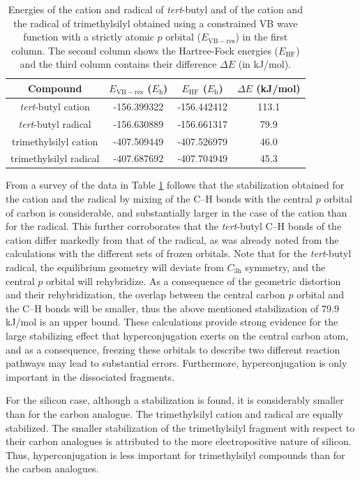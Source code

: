 \begin{table}[htp]
\center
\caption{Energies of the cation and radical of \textit{tert}-butyl and of the cation and the radical of trimethylsilyl obtained using a constrained VB wave function with a strictly atomic $p$ orbital ($E_\mathrm{VB-res}$) in the first column. The second column shows the Hartree-Fock energies ($E_\mathrm{HF}$) and the third column contains their difference $\Delta E$ (in kJ/mol).}
\label{ch3.tab.hyp}
\begin{tabular}{|c|c|c|c|}
\hline
\textbf{Compound} & $E_\mathrm{VB-res}$ ($E_{\mathrm{h}}$) &$E_\mathrm{HF}$ ($E_{\mathrm{h}}$)& $\Delta E$ (kJ/mol)  \\
\hline
\textit{tert}-butyl cation & -156.399322 &-156.442412&113.1  \\
\textit{tert}-butyl radical & -156.630889 &-156.661317&79.9 \\
trimethylsilyl cation & -407.509449&-407.526979&46.0 \\
trimethylsilyl radical &-407.687692&-407.704949&45.3 \\
\hline
\end{tabular}
\end{table}

From a survey of the data in Table \ref{ch3.tab.hyp} follows that the stabilization obtained for the cation and the radical by mixing of the C--H bonds with the central $p$ orbital of carbon is considerable, and substantially larger in the case of the cation than for the radical.  This further corroborates that the \textit{tert}-butyl C--H bonds of the cation differ markedly from that of the radical, as was already noted from the calculations with the different sets of frozen orbitals.  Note that for the \textit{tert}-butyl radical, the equilibrium geometry will deviate from $C_\mathrm{3h}$ symmetry, and the central $p$ orbital will rehybridize.  As a consequence of the geometric distortion and their rehybridization, the overlap between the central carbon $p$ orbital and the C--H bonds will be smaller, thus the above mentioned stabilization of 79.9 kJ/mol is an upper bound.  These calculations provide strong evidence for the large stabilizing effect that hyperconjugation exerts on the central carbon atom, and as a consequence, freezing these orbitals to describe two different reaction pathways may lead to substantial errors.  Furthermore, hyperconjugation is only important in the dissociated fragments.

For the silicon case, although a stabilization is found, it is considerably smaller than for the carbon analogue.  The trimethylsilyl cation and radical are equally stabilized.  The smaller stabilization of the trimethylsilyl fragment with respect to their carbon analogues is attributed to the more electropositive nature of silicon. Thus, hyperconjugation is less important for trimethylsilyl compounds than for the carbon analogues.

